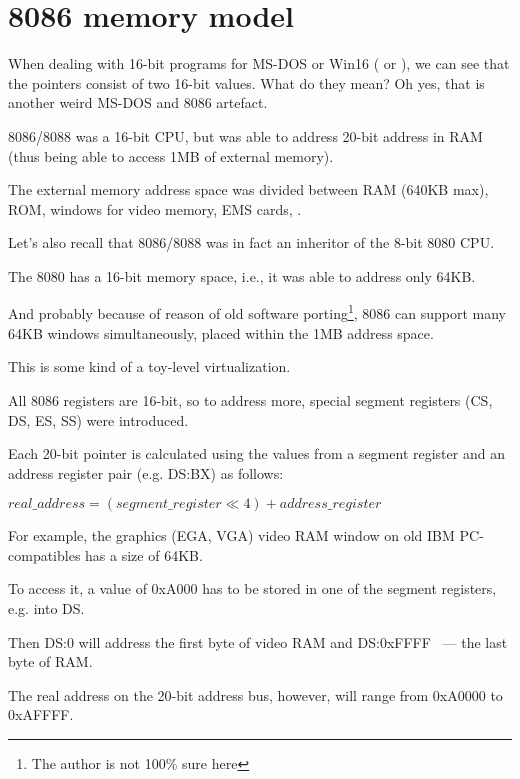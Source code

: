 \section{8086 memory model}
\label{8086_memory_model}

When dealing with 16-bit programs for MS-DOS or Win16
( or ),
we can see that the pointers consist of two 16-bit values.
What do they mean? Oh yes, that is another weird MS-DOS and 8086 artefact.

8086/8088 was a 16-bit CPU, but was able to address 20-bit address in RAM 
(thus being able to access 1MB of external memory).

The external memory address space was divided between \ac{RAM} (640KB max),
\ac{ROM}, windows for video memory, EMS cards, \etc{}.

Let's also recall that 8086/8088 was in fact an inheritor of the 8-bit 8080 CPU.

The 8080 has a 16-bit memory space, i.e., it was able to address only 64KB.

And probably because of reason of old software porting\footnote{The author is not 100\% sure here},
8086 can support many 64KB windows simultaneously, placed
within the 1MB address space.

This is some kind of a toy-level virtualization.

All 8086 registers are 16-bit, so to address more, special segment registers (CS, DS, ES, SS) were
introduced.

Each 20-bit pointer is calculated using the values from a segment register and 
an address register pair (e.g. DS:BX) as follows:

\begin{center}
$real\_address = (segment\_register \ll 4) + address\_register$
\end{center}

For example, the graphics (\ac{EGA}, \ac{VGA}) video \ac{RAM} window on old IBM PC-compatibles 
has a size of 64KB.

To access it, a value of 0xA000 has to be stored in one of the segment registers, e.g. into DS.

Then DS:0 will address the first byte of video \ac{RAM} and DS:0xFFFF ~--- the last byte of RAM.

The real address on the 20-bit address bus, however, will range from 0xA0000 to 0xAFFFF.

